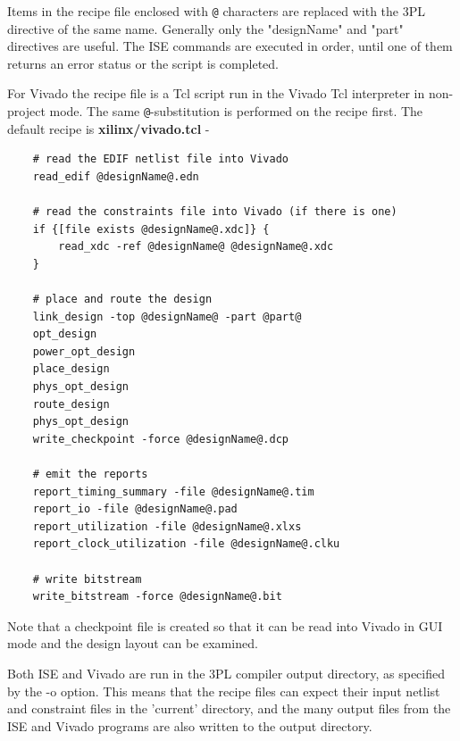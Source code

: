 	Items in the recipe file enclosed with \verb+@+ characters are replaced
	with the 3PL directive of the same name. Generally only the "designName"
	and "part" directives are useful.
	The ISE commands are executed in order, until one of them returns an
	error status or the script is completed.


	For Vivado the recipe file is a Tcl script run in the Vivado Tcl
	interpreter in non-project mode.
	The same \verb+@+-substitution is performed on the recipe first.
	The default recipe is {\bf xilinx/vivado.tcl} -

        \begin{verbatim}
	# read the EDIF netlist file into Vivado
	read_edif @designName@.edn

	# read the constraints file into Vivado (if there is one)
	if {[file exists @designName@.xdc]} {
	    read_xdc -ref @designName@ @designName@.xdc
	}

	# place and route the design
	link_design -top @designName@ -part @part@
	opt_design
	power_opt_design
	place_design
	phys_opt_design
	route_design
	phys_opt_design
	write_checkpoint -force @designName@.dcp

	# emit the reports
	report_timing_summary -file @designName@.tim
	report_io -file @designName@.pad
	report_utilization -file @designName@.xlxs
	report_clock_utilization -file @designName@.clku

	# write bitstream
	write_bitstream -force @designName@.bit
	\end{verbatim}

        Note that a checkpoint file is created so that it can be read into
	Vivado in GUI mode and the design layout can be examined.

	Both ISE and Vivado are run in the 3PL compiler output directory, as
	specified by the -o option. This means that the recipe files can expect
	their input netlist and constraint files in the 'current' directory,
	and the many output files from the ISE and Vivado programs are also
	written to the output directory.

